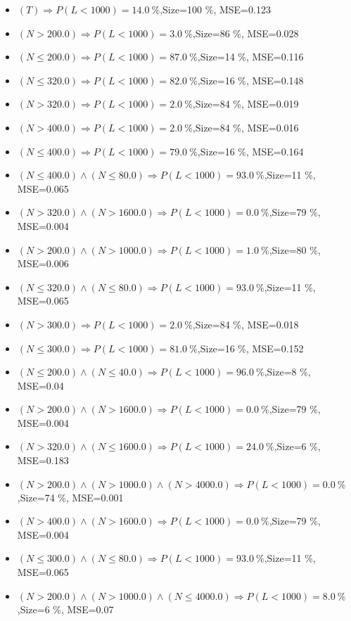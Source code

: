 \documentclass[numbered]{CSL}
\begin{document}
\begin{itemize}
\item $(T) \Rightarrow P(L < 1 000) = 14.0~\%$,\hfill Size=100 \%, MSE=0.123
\item $(N > 200.0) \Rightarrow P(L < 1 000) = 3.0~\%$,\hfill Size=86 \%, MSE=0.028
\item $(N \leq 200.0) \Rightarrow P(L < 1 000) = 87.0~\%$,\hfill Size=14 \%, MSE=0.116
\item $(N \leq 320.0) \Rightarrow P(L < 1 000) = 82.0~\%$,\hfill Size=16 \%, MSE=0.148
\item $(N > 320.0) \Rightarrow P(L < 1 000) = 2.0~\%$,\hfill Size=84 \%, MSE=0.019
\item $(N > 400.0) \Rightarrow P(L < 1 000) = 2.0~\%$,\hfill Size=84 \%, MSE=0.016
\item $(N \leq 400.0) \Rightarrow P(L < 1 000) = 79.0~\%$,\hfill Size=16 \%, MSE=0.164
\item $(N \leq 400.0) \land (N \leq 80.0) \Rightarrow P(L < 1 000) = 93.0~\%$,\hfill Size=11 \%, MSE=0.065
\item $(N > 320.0) \land (N > 1600.0) \Rightarrow P(L < 1 000) = 0.0~\%$,\hfill Size=79 \%, MSE=0.004
\item $(N > 200.0) \land (N > 1000.0) \Rightarrow P(L < 1 000) = 1.0~\%$,\hfill Size=80 \%, MSE=0.006
\item $(N \leq 320.0) \land (N \leq 80.0) \Rightarrow P(L < 1 000) = 93.0~\%$,\hfill Size=11 \%, MSE=0.065
\item $(N > 300.0) \Rightarrow P(L < 1 000) = 2.0~\%$,\hfill Size=84 \%, MSE=0.018
\item $(N \leq 300.0) \Rightarrow P(L < 1 000) = 81.0~\%$,\hfill Size=16 \%, MSE=0.152
\item $(N \leq 200.0) \land (N \leq 40.0) \Rightarrow P(L < 1 000) = 96.0~\%$,\hfill Size=8 \%, MSE=0.04
\item $(N > 200.0) \land (N > 1600.0) \Rightarrow P(L < 1 000) = 0.0~\%$,\hfill Size=79 \%, MSE=0.004
\item $(N > 320.0) \land (N \leq 1600.0) \Rightarrow P(L < 1 000) = 24.0~\%$,\hfill Size=6 \%, MSE=0.183
\item $(N > 200.0) \land (N > 1000.0) \land (N > 4000.0) \Rightarrow P(L < 1 000) = 0.0~\%$,\hfill Size=74 \%, MSE=0.001
\item $(N > 400.0) \land (N > 1600.0) \Rightarrow P(L < 1 000) = 0.0~\%$,\hfill Size=79 \%, MSE=0.004
\item $(N \leq 300.0) \land (N \leq 80.0) \Rightarrow P(L < 1 000) = 93.0~\%$,\hfill Size=11 \%, MSE=0.065
\item $(N > 200.0) \land (N > 1000.0) \land (N \leq 4000.0) \Rightarrow P(L < 1 000) = 8.0~\%$,\hfill Size=6 \%, MSE=0.07
\end{itemize}
\end{document}
